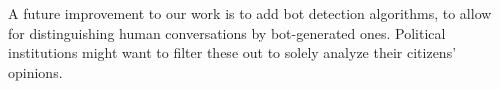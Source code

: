         A future improvement to our work is to add bot detection algorithms, to allow for distinguishing human conversations by bot-generated ones. Political institutions might want to filter these out to solely analyze their citizens' opinions.
        
        
        
        
        
        
        
